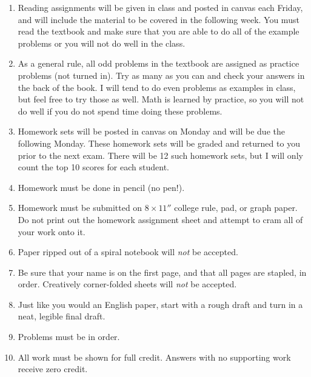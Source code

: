 \documentclass[letterpaper,12pt,fleqn]{article}
\begin{document}

\vspace{0.5in}

\begin{enumerate}

\item Reading assignments will be given in class and posted in canvas each
    Friday, and will include the material to be covered in the following week.
    You must read the textbook and make sure that you are able to do all of the
    example problems or you will not do well in the class.

\item As a general rule, all odd problems in the textbook are assigned as
    practice problems (not turned in). Try as many as you can and check your
    answers in the back of the book. I will tend to do even problems as
    examples in class, but feel free to try those as well. Math is learned by
    practice, so you will not do well if you do not spend time doing these
    problems.

\item Homework sets will be posted in canvas on Monday and will be due the
    following Monday. These homework sets will be graded and returned to you
    prior to the next exam. There will be 12 such homework sets, but I will
    only count the top 10 scores for each student.

\item Homework must be done in pencil (no pen!).

\item Homework must be submitted on $8\times11''$ college rule, pad, or graph
    paper. Do not print out the homework assignment sheet and attempt to cram
    all of your work onto it.

\item Paper ripped out of a spiral notebook will \emph{not} be accepted.

\item Be sure that your name is on the first page, and that all pages are
    stapled, in order. Creatively corner-folded sheets will \emph{not} be
    accepted.

\item Just like you would an English paper, start with a rough draft and turn
    in a neat, legible final draft.

\item Problems must be in order.

\item All work must be shown for full credit. Answers with no supporting work
    receive zero credit.


\end{enumerate}
\end{document}
